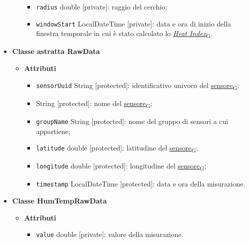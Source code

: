 \begin{itemize}
\begin{itemize}
\begin{itemize}
			            \item  \texttt{radius} double [private]: raggio del cerchio;
			            \item  \texttt{windowStart} LocalDateTime [private]: data e ora di inizio della finestra temporale in cui è stato calcolato lo \href{https://7last.github.io/docs/pb/documentazione-interna/glossario\#heat-index}{\textit{Heat Index}\textsubscript{G}}.
		            \end{itemize}
	      \end{itemize}
	\item \textbf{Classe astratta RawData}\label{abstract_class_raw_data}
	      \begin{itemize}
		      \item \textbf{Attributi}
		            \begin{itemize}
			            \item \texttt{sensorUuid} String [protected]: identificativo univoco del \href{https://7last.github.io/docs/pb/documentazione-interna/glossario\#sensore}{sensore\textsubscript{G}};
			            \item \texttt{} String [protected]: nome del \href{https://7last.github.io/docs/pb/documentazione-interna/glossario\#sensore}{sensore\textsubscript{G}};
			            \item \texttt{groupName} String [protected]: nome del gruppo di sensori a cui appartiene;
			            \item \texttt{latitude} double [protected]: latitudine del \href{https://7last.github.io/docs/pb/documentazione-interna/glossario\#sensore}{sensore\textsubscript{G}};
			            \item \texttt{longitude} double [protected]: longitudine del \href{https://7last.github.io/docs/pb/documentazione-interna/glossario\#sensore}{sensore\textsubscript{G}};
			            \item \texttt{timestamp} LocalDateTime [protected]: data e ora della misurazione.
		            \end{itemize}
	      \end{itemize}
	\item \textbf{Classe HumTempRawData}
	      \begin{itemize}
		      \item \textbf{Attributi}
		            \begin{itemize}
			            \item \texttt{value} double [private]: valore della misurazione.
		            \end{itemize}
	      \end{itemize}
\end{itemize}

